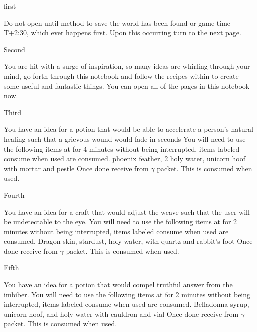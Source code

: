 \documentclass[greennotebook]{guildcamp3} %
\begin{document}
\startnotebook{\nMagOneRecipes{}}

\begin{page}{first}
	
	Do not open until method to save the world has been found or game time T+2:30, which ever happens first. Upon this occurring turn to the next page.
	
\end{page}

\begin{page}{Second}
	
	You are hit with a surge of inspiration, so many ideas are whirling through your mind, go forth through this notebook and follow the recipes within to create some useful and fantastic things. You can open all of the pages in this notebook now.
	
\end{page}

\begin{page}{Third}
	
	You have an idea for a potion that would be able to accelerate a person's natural healing such that a grievous wound would fade in seconds
	You will need to use the following items at \sMageWorkbench{} for 4 minutes without being interrupted, items labeled consume when used are consumed.
	phoenix feather, 2 holy water, unicorn hoof with mortar and pestle
	Once done receive \iHealthRemedy{} from $\gamma$ packet. This is consumed when used. 
	
\end{page}

\begin{page}{Fourth}
	
	You have an idea for a craft that would adjust the weave such that the user will be undetectable to the eye.
	You will need to use the following items at\sMageWorkbench{} for 2 minutes without being interrupted, items labeled consume when used are consumed.
	Dragon skin, stardust, holy water, with quartz and rabbit's foot
	Once done receive \iInvisibilityCloak{} from $\gamma$ packet. This is consumed when used.  
	
\end{page}

\begin{page}{Fifth}
	
	You have an idea for a potion that would compel truthful answer from the imbiber.
	You will need to use the following items at \sMageWorkbench{} for 2 minutes without being interrupted, items labeled consume when used are consumed.
	Belladonna syrup, unicorn hoof, and holy water with cauldron and vial
	Once done receive \iTruthPotion{} from $\gamma$ packet. This is consumed when used. 
	
\end{page}
\end{document}
